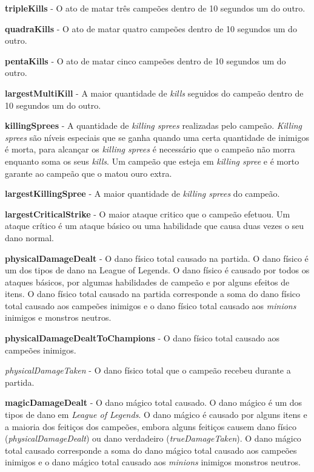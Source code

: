 \textbf{tripleKills} - O ato de matar três campeões dentro de 10 segundos um do outro.

\textbf{quadraKills} - O ato de matar quatro campeões dentro de 10 segundos um do outro.

\textbf{pentaKills} - O ato de matar cinco campeões dentro de 10 segundos um do outro.

\textbf{largestMultiKill} - A maior quantidade de \textit{kills} seguidos do campeão dentro de 10 segundos um do outro.

\textbf{killingSprees} - A quantidade de \textit{killing sprees} realizadas pelo campeão. \textit{Killing sprees} são níveis especiais que se ganha quando uma certa quantidade de inimigos é morta, para alcançar os \textit{killing sprees} é necessário que o campeão não morra enquanto soma os seus \textit{kills}. Um campeão que esteja em \textit{killing spree} e é morto garante ao campeão que o matou ouro extra.

\textbf{largestKillingSpree} - A maior quantidade de \textit{killing sprees} do campeão.

\textbf{largestCriticalStrike} - O maior ataque critico que o campeão efetuou. Um ataque crítico é um ataque básico ou uma habilidade que causa duas vezes o seu dano normal.

\textbf{physicalDamageDealt} - O dano físico total causado na partida. O dano físico é um dos tipos de dano na League of Legends. O dano físico é causado por todos os ataques básicos, por algumas habilidades de campeão e por alguns efeitos de itens. O dano físico total causado na partida corresponde a soma do dano físico total causado aos campeões inimigos e o dano físico total causado aos \textit{minions} inimigos e monstros neutros.

\textbf{physicalDamageDealtToChampions} - O dano físico total causado aos campeões inimigos.

\textit{physicalDamageTaken} - O dano físico total que o campeão recebeu durante a partida.

\textbf{magicDamageDealt} - O dano mágico total causado. O dano mágico é um dos tipos de dano em \textit{League of Legends}. O dano mágico é causado por alguns itens e a maioria dos feitiços dos campeões, embora alguns feitiços causem dano físico (\textit{physicalDamageDealt}) ou dano verdadeiro (\textit{trueDamageTaken}). O dano mágico total causado corresponde a soma do dano mágico total causado aos campeões inimigos e o dano mágico total causado aos \textit{minions} inimigos monstros neutros.

